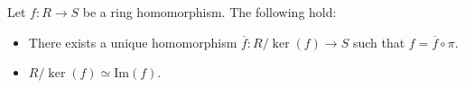 \documentclass [12pt] {article}
\newenvironment{theorem}[1]{\begin{tcolorbox}[title={Theorem #1},colback=green!5!white,colframe=black!75!green]}{\end{tcolorbox}}
\renewcommand{\Im}{\text{Im}}
\begin{document}
\newpage
\begin{theorem}{(First Isomorphism Theorem)}
    \label{thm:isothm}
    Let $f : R \to S$ be a ring homomorphism. The following hold:
    \begin{itemize}[label=$\to$, leftmargin=*, itemsep=0em]
        \item There exists a unique homomorphism $\overline{f} : R/\ker(f) \to S$ such that
            $f = \overline{f} \circ \pi$.
        \item $R/\ker(f) \simeq \Im(f)$.
    \end{itemize}
    \begin{center}
    \end{center}
\end{theorem}
\end{document}
